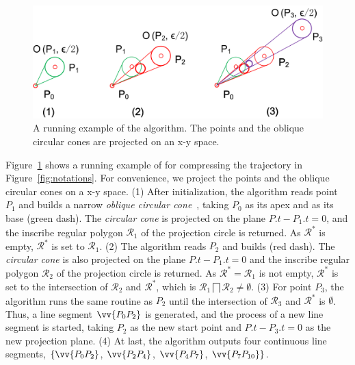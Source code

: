 \begin{figure}[tb!]
	\centering
	\includegraphics[scale=0.66]{Figures/Fig-Conest.png}
	\vspace{-3ex}
	\caption{\small A running example of the \cised algorithm. The points and the oblique circular cones are projected on an x-y space. }%
	\vspace{-3ex}
	\label{fig:exm-const}
\end{figure}


\begin{example}
\label{exm-alg-conest}
	Figure~\ref{fig:exm-const} shows a running example of \cised for compressing the trajectory  in Figure~\ref{fig:notations}. 
	For convenience, we project the points and the oblique circular cones on a x-y space.
%	
	(1) After initialization, the \cised algorithm reads point $P_1$ and builds a narrow \emph{oblique circular cone}~, taking $P_0$ as its apex and  as its base (green dash). The \emph{circular cone} is projected on the plane $P.t-P_1.t=0$, and the inscribe regular polygon $\mathcal{R}_1$ of the projection circle is returned. As $\mathcal{R}^*$ is empty, $\mathcal{R}^*$ is set to $\mathcal{R}_1$.
%	
	(2) The algorithm reads $P_2$ and builds  (red dash). The \emph{circular cone} is also projected on the plane $P.t-P_1.t=0$ and the inscribe regular polygon $\mathcal{R}_2$ of the projection circle is returned. As $\mathcal{R}^*=\mathcal{R}_1$ is not empty, $\mathcal{R}^*$ is set to the intersection of $\mathcal{R}_2$ and $\mathcal{R}^*$, which is $\mathcal{R}_1 \bigsqcap \mathcal{R}_2 \ne \emptyset$.
%	
	(3) For point $P_3$, the algorithm runs the same routine as $P_2$ until the intersection of $\mathcal{R}_3$ and $\mathcal{R}^*$ is $\emptyset$. Thus, a line segment $\vv{P_0P_2}$ is generated, and the process of a new line segment is started, taking $P_2$ as the new start point and $P.t-P_3.t=0$ as the new projection plane.
%	
	(4) At last, the algorithm outputs four continuous line segments, \ie $\{\vv{P_0P_2}$, $\vv{P_2P_4}$, $\vv{P_4P_{7}}$, $\vv{P_7P_{10}}\}$. %
\end{example} 	
\vspace{-1ex}



